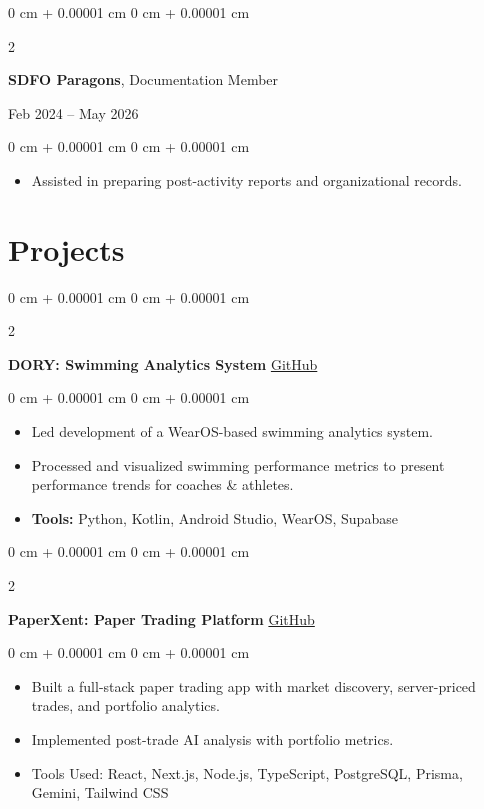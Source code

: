 \documentclass[10pt, letterpaper]{article}
\newenvironment{highlights}{
    \begin{itemize}[
        topsep=0.04 cm,
        parsep=0.04 cm,
        partopsep=0pt,
        itemsep=0pt,
        leftmargin=0 cm + 10pt
    ]
}{
    \end{itemize}
} %
\newenvironment{onecolentry}{
    \begin{adjustwidth}{
        0 cm + 0.00001 cm
    }{
        0 cm + 0.00001 cm
    }
}{
    \end{adjustwidth}
} %
\newenvironment{twocolentry}[2][]{
    \onecolentry
    \def\secondColumn{#2}
    \setcolumnwidth{\fill, 4.5 cm}
    \begin{paracol}{2}
}{
    \switchcolumn \raggedleft \secondColumn
    \end{paracol}
    \endonecolentry
} %
\begin{document}
\vspace{0.08 cm}

\begin{twocolentry}{
    Feb 2024 -- May 2026
}
    \textbf{SDFO Paragons}, Documentation Member
\end{twocolentry}

\vspace{0.05 cm}
\begin{onecolentry}
    \begin{highlights}
        \item Assisted in preparing post-activity reports and organizational records.
    \end{highlights}
\end{onecolentry}

    \section{Projects}
        \begin{twocolentry}{
            \href{https://github.com/daniellalimbag/dory-app}{GitHub}
        }
            \textbf{DORY: Swimming Analytics System}\end{twocolentry}
        \vspace{0.05 cm}
        \begin{onecolentry}
            \begin{highlights}
            \item Led development of a WearOS-based swimming analytics system.
            \item Processed and visualized swimming performance metrics to present performance trends for coaches \& athletes.
            \item \textbf{Tools:} Python, Kotlin, Android Studio, WearOS, Supabase
            \end{highlights}
        \end{onecolentry}
        \vspace{0.08 cm}
        \begin{twocolentry}{
            \href{https://github.com/daniellalimbag/PaperXent}{GitHub}
        }
        \textbf{PaperXent: Paper Trading Platform}\end{twocolentry}
        \vspace{0.05 cm}
        \begin{onecolentry}
            \begin{highlights}
            \item Built a full-stack paper trading app with market discovery, server-priced trades, and portfolio analytics.
            \item Implemented post-trade AI analysis with portfolio metrics.
            \item Tools Used: React, Next.js, Node.js, TypeScript, PostgreSQL, Prisma, Gemini, Tailwind CSS
            \end{highlights}
        \end{onecolentry}
        \vspace{0.08 cm}
\end{document}
